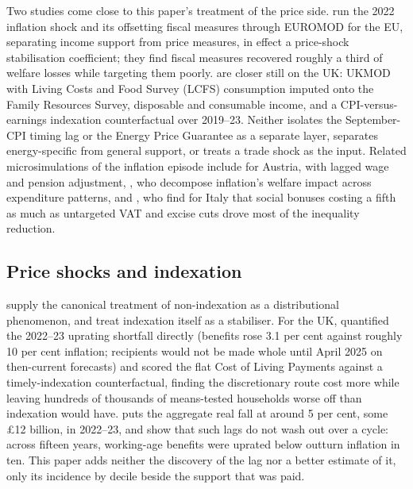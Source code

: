 Two studies come close to this paper's treatment of the price side.
\citet{amores2025} run the 2022 inflation shock and its offsetting
fiscal measures through EUROMOD for the EU, separating income support
from price measures, in effect a price-shock stabilisation
coefficient; they find fiscal measures recovered roughly a third of
welfare losses while targeting them poorly. \citet{popova2026} are
closer still on the UK: UKMOD with Living Costs and Food Survey (LCFS) consumption imputed onto the
Family Resources Survey, disposable and consumable income, and a CPI-versus-earnings
indexation counterfactual over 2019--23. Neither isolates the
September-CPI timing lag or the Energy Price Guarantee as a separate
layer, separates energy-specific from general support, or treats a
trade shock as the input. Related microsimulations of the inflation
episode include \citet{eckerstorfer2025} for Austria, with lagged wage
and pension adjustment, \citet{sologon2025}, who decompose inflation's
welfare impact across expenditure patterns, and \citet{curci2025}, who
find for Italy that social bonuses costing a fifth as much as
untargeted VAT and excise cuts drove most of the inequality reduction.

\subsection{Price shocks and indexation}

\citet{paulus2020} supply the canonical treatment of non-indexation as
a distributional phenomenon, and \citet{leventi2024} treat indexation
itself as a stabiliser. For the UK, \citet{cribb2023} quantified the
2022--23 uprating shortfall directly (benefits rose 3.1 per cent
against roughly 10 per cent inflation; recipients would not be made
whole until April 2025 on then-current forecasts) and scored the flat
Cost of Living Payments against a timely-indexation counterfactual,
finding the discretionary route cost more while leaving hundreds of
thousands of means-tested households worse off than indexation would
have. \citet{obrwelfare2022} puts the aggregate real fall at around
5 per cent, some \pounds 12 billion, in 2022--23, and
\citet{judgemurphy2023} show that such lags do not wash out over a
cycle: across fifteen years, working-age benefits were uprated below
outturn inflation in ten. This paper adds neither the discovery of the
lag nor a better estimate of it, only its incidence by decile beside
the support that was paid.


